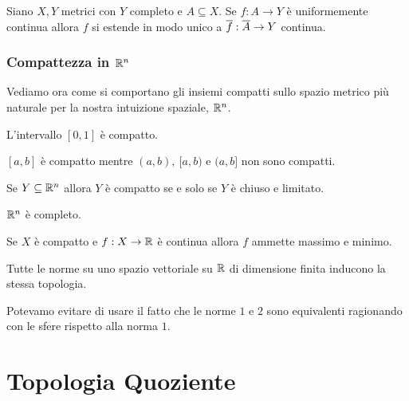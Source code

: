 \begin{multicols*}{2}
\begin{theorem}\label{UniformementeContinuaSiEstendeAllaChiusuraDelDominio}
Siano $X,Y$ metrici con $Y$ completo e $A\subseteq X$. Se $f:A\to Y$ è uniformemente continua allora $f$ si estende in modo unico a $\overline{f}:\overline{A}\to Y$ continua.
\end{theorem}


\subsubsection{Compattezza in $\mathbb{R}^n$}
Vediamo ora come si comportano gli insiemi compatti sullo spazio metrico più naturale per la nostra intuizione spaziale, $\mathbb{R}^n$.
\begin{theorem}\label{IntervalloChiusoECompatto}
L'intervallo $[0,1]$ è compatto.
\end{theorem}

\begin{application}
$[a,b]$ è compatto mentre $(a,b),\ [a,b)$ e $(a,b]$ non sono compatti.
\end{application}

\begin{theorem}\label{TeoremaHeineBorel}
Se $Y\subseteq \mathbb{R}^n$ allora $Y$ è compatto se e solo se $Y$ è chiuso e limitato.
\end{theorem}
\begin{application}\label{RnECompleto}
$\mathbb{R}^n$ è completo.
\end{application}

\begin{theorem}[Weierstrass]\label{TeoremaWeierstrass}
Se $X$ è compatto e $f:X\to \mathbb{R}$ è continua allora $f$ ammette massimo e minimo.
\end{theorem}

\begin{theorem}\label{EquivalenzaNormeRn}
Tutte le norme su uno spazio vettoriale su $\mathbb{R}$ di dimensione finita inducono la stessa topologia.
\end{theorem}
\begin{remark}
Potevamo evitare di usare il fatto che le norme $1$ e $2$ sono equivalenti ragionando con le sfere rispetto alla norma $1$.
\end{remark}


\section{Topologia Quoziente}


\end{multicols*}
